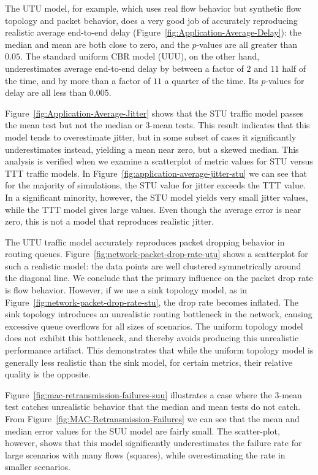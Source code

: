 \documentclass[conference]{IEEEtran}
\newcommand{\caps}[1]{{\small{#1}}}
\begin{document}
The \caps{UTU} model, for example, which uses real flow behavior but synthetic flow topology and packet behavior, does a very good job of accurately reproducing realistic average end-to-end delay (Figure~\ref{fig:Application-Average-Delay}): the median and mean are both close to zero, and the $p$-values are all greater than $0.05$. The standard uniform \caps{CBR} model (\caps{UUU}), on the other hand, underestimates average end-to-end delay by between a factor of $2$ and $11$ half of the time, and by more than a factor of $11$ a quarter of the time. Its $p$-values for delay are all less than $0.005$.

Figure~\ref{fig:Application-Average-Jitter} shows that the \caps{STU} traffic model passes the mean test but not the median or 3-mean tests. This result indicates that this model tends to overestimate jitter, but in some subset of cases it significantly underestimates instead, yielding a mean near zero, but a skewed median. This analysis is verified when we examine a scatterplot of metric values for \caps{STU} versus \caps{TTT} traffic models. In Figure~\ref{fig:application-average-jitter-stu} we can see that for the majority of simulations, the \caps{STU} value for jitter exceeds the \caps{TTT} value. In a significant minority, however, the \caps{STU} model yields very small jitter values, while the \caps{TTT} model gives large values. Even though the average error is near zero, this is not a model that reproduces realistic jitter.

The \caps{UTU} traffic model accurately reproduces packet dropping behavior in routing queues. Figure~\ref{fig:network-packet-drop-rate-utu} shows a scatterplot for such a realistic model: the data points are well clustered symmetrically around the diagonal line. We conclude that the primary influence on the packet drop rate is flow behavior. However, if we use a sink topology model, as in Figure~\ref{fig:network-packet-drop-rate-stu}, the drop rate becomes inflated. The sink topology introduces an unrealistic routing bottleneck in the network, causing excessive queue overflows for all sizes of scenarios. The uniform topology model does not exhibit this bottleneck, and thereby avoids producing this unrealistic performance artifact. This demonstrates that while the uniform topology model is generally less realistic than the sink model, for certain metrics, their relative quality is the opposite.

Figure~\ref{fig:mac-retransmission-failures-suu} illustrates a case where the 3-mean test catches unrealistic behavior that the median and mean tests do not catch. From Figure~\ref{fig:MAC-Retransmission-Failures} we can see that the mean and median error values for the \caps{SUU} model are fairly small. The scatter-plot, however, shows that this model significantly underestimates the failure rate for large scenarios with many flows (squares), while overestimating the rate in smaller scenarios.
\end{document}

